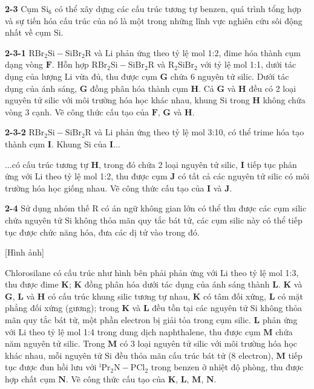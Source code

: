 \noindent
\textbf{2-3} Cụm $\mathrm{Si_6}$ có thể xây dựng các cấu trúc tương tự benzen, quá trình tổng hợp và sự tiến hóa cấu trúc của nó là một trong những lĩnh vực nghiên cứu sôi động nhất về cụm $\mathrm{Si}$.

\vspace{0.2cm}

\noindent
\textbf{2-3-1} $\mathrm{RBr_2Si-SiBr_2R}$ và $\mathrm{Li}$ phản ứng theo tỷ lệ mol 1:2, đime hóa thành cụm dạng vòng $\mathbf{F}$. Hỗn hợp $\mathrm{RBr_2Si-SiBr_2R}$ và $\mathrm{R_2SiBr_2}$ với tỷ lệ mol 1:1, dưới tác dụng của lượng $\mathrm{Li}$ vừa đủ, thu được cụm $\mathbf{G}$ chứa 6 nguyên tử silic. Dưới tác dụng của ánh sáng, $\mathbf{G}$ đồng phân hóa thành cụm $\mathbf{H}$. Cả $\mathbf{G}$ và $\mathbf{H}$ đều có 2 loại nguyên tử silic với môi trường hóa học khác nhau, khung $\mathrm{Si}$ trong $\mathbf{H}$ không chứa vòng 3 cạnh. Vẽ công thức cấu tạo của $\mathbf{F}$, $\mathbf{G}$ và $\mathbf{H}$.

\vspace{0.2cm}

\noindent
\textbf{2-3-2} $\mathrm{RBr_2Si-SiBr_2R}$ và $\mathrm{Li}$ phản ứng theo tỷ lệ mol 3:10, có thể trime hóa tạo thành cụm $\mathbf{I}$. Khung $\mathrm{Si}$ của $\mathbf{I}$... 

\noindent
...có cấu trúc tương tự $\mathbf{H}$, trong đó chứa 2 loại nguyên tử silic, $\mathbf{I}$ tiếp tục phản ứng với $\mathrm{Li}$ theo tỷ lệ mol 1:2, thu được cụm $\mathbf{J}$ có tất cả các nguyên tử silic có môi trường hóa học giống nhau. Vẽ công thức cấu tạo của $\mathbf{I}$ và $\mathbf{J}$.

\vspace{0.2cm}

\noindent
\textbf{2-4} Sử dụng nhóm thế $\mathrm{R}$ có án ngữ không gian lớn có thể thu được các cụm silic chứa nguyên tử $\mathrm{Si}$ không thỏa mãn quy tắc bát tử, các cụm silic này có thể tiếp tục được chức năng hóa, đưa các dị tử vào trong đó. 

\begin{center}
    [Hình ảnh]
\end{center}
Chlorosilane có cấu trúc như hình bên phải phản ứng với $\mathrm{Li}$ theo tỷ lệ mol 1:3, thu được đime $\mathbf{K}$; $\mathbf{K}$ đồng phân hóa dưới tác dụng của ánh sáng thành $\mathbf{L}$. $\mathbf{K}$ và $\mathbf{G}$, $\mathbf{L}$ và $\mathbf{H}$ có cấu trúc khung silic tương tự nhau, $\mathbf{K}$ có tâm đối xứng, $\mathbf{L}$ có mặt phẳng đối xứng (gương); trong $\mathbf{K}$ và $\mathbf{L}$ đều tồn tại các nguyên tử $\mathrm{Si}$ không thỏa mãn quy tắc bát tử, một phần electron bị giải tỏa trong cụm silic. $\mathbf{L}$ phản ứng với $\mathrm{Li}$ theo tỷ lệ mol 1:4 trong dung dịch naphthalene, thu được cụm $\mathbf{M}$ chứa năm nguyên tử silic. Trong $\mathbf{M}$ có 3 loại nguyên tử silic với môi trường hóa học khác nhau, mỗi nguyên tử $\mathrm{Si}$ đều thỏa mãn cấu trúc bát tử (8 electron), $\mathbf{M}$ tiếp tục được đun hồi lưu với $\mathrm{^iPr_2N-PCl_2}$ trong benzen ở nhiệt độ phòng, thu được hợp chất cụm $\mathbf{N}$. Vẽ công thức cấu tạo của $\mathbf{K}$, $\mathbf{L}$, $\mathbf{M}$, $\mathbf{N}$.

